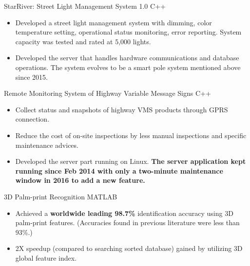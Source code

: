 \documentclass[11pt,a4paper]{moderncv}
\begin{document}
{StarRiver: Street Light Management System 1.0}
{C++}
{}{}
{
\begin{itemize}
	\item Developed a street light management system with dimming, color temperature setting, operational status monitoring, error reporting. System capacity was tested and rated at 5,000 lights.
	\item Developed the server that handles hardware communications and database operations. The system evolves to be a smart pole system mentioned above since 2015.
\end{itemize}
}

{Remote Monitoring System of Highway Variable Message Signs}
{C++}
{}{}
{
\begin{itemize}
	\item Collect status and snapshots of highway VMS products through GPRS connection.
	\item Reduce the cost of on-site inspections by less manual inspections and  specific maintenance advices.
	\item Developed the server part running on Linux. \textbf{The server application kept running since Feb 2014 with only a two-minute maintenance window in 2016 to add a new feature.}
\end{itemize}
}

%
%

{3D Palm-print Recognition}
{MATLAB}
{}{}
{
\begin{itemize}
	\item Achieved a \textbf{worldwide leading 98.7\%} identification accuracy using 3D palm-print features. (Accuracies found in previous literature were less than 93\%.)
	\item 2X speedup (compared to searching sorted database) gained by utilizing 3D global feature index.
\end{itemize}
}
\end{document}
